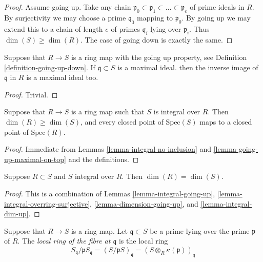 \begin{proof}
Assume going up.
Take any chain $\mathfrak p_0 \subset \mathfrak p_1 \subset \ldots
\subset \mathfrak p_e$ of prime ideals in $R$.
By surjectivity we may choose a prime $\mathfrak q_0$ mapping
to $\mathfrak p_0$. By going up we may extend this to a chain
of length $e$ of primes $\mathfrak q_i$ lying over
$\mathfrak p_i$. Thus $\dim(S) \geq \dim(R)$.
The case of going down is exactly the same.
\end{proof}

\begin{lemma}
\label{lemma-going-up-maximal-on-top}
Suppose that $R \to S$ is a ring map with the going up property,
see Definition \ref{definition-going-up-down}. If
$\mathfrak q \subset S$ is a maximal ideal.
then the inverse image of $\mathfrak q$ in $R$
is a maximal ideal too.
\end{lemma}

\begin{proof}
Trivial.
\end{proof}

\begin{lemma}
\label{lemma-integral-dim-up}
Suppose that $R \to S$ is a ring map such that $S$ is integral over $R$.
Then $\dim (R) \geq \dim(S)$, and every closed point of $\text{Spec}(S)$
maps to a closed point of $\text{Spec}(R)$.
\end{lemma}

\begin{proof}
Immediate from Lemmas \ref{lemma-integral-no-inclusion} and
\ref{lemma-going-up-maximal-on-top}
and the definitions.
\end{proof}

\begin{lemma}
\label{lemma-integral-sub-dim-equal}
Suppose $R \subset S$ and $S$ integral over $R$.
Then $\dim(R) = \dim(S)$.
\end{lemma}

\begin{proof}
This is a combination of Lemmas
\ref{lemma-integral-going-up},
\ref{lemma-integral-overring-surjective},
\ref{lemma-dimension-going-up}, and
\ref{lemma-integral-dim-up}.
\end{proof}

\begin{definition}
\label{definition-fibre}
Suppose that $R \to S$ is a ring map.
Let $\mathfrak q \subset S$ be a prime lying
over the prime $\mathfrak p$ of $R$.
The {\it local ring of the fibre at $\mathfrak q$}
is the local ring
$$
S_{\mathfrak q}/\mathfrak pS_{\mathfrak q}
=
(S/\mathfrak pS)_{\mathfrak q}
=
(S\otimes_R \kappa(\mathfrak p))_{\mathfrak q}
$$
\end{definition}

